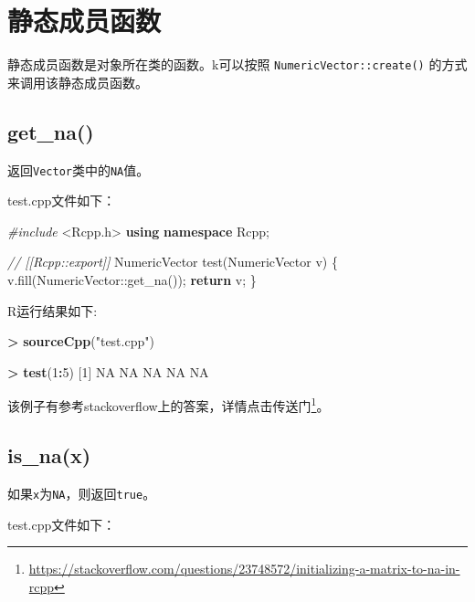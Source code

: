\documentclass[]{ctexbook}
\newenvironment{Shaded}{\begin{snugshade}}{\end{snugshade}}
\newcommand{\KeywordTok}[1]{\textcolor[rgb]{0.13,0.29,0.53}{\textbf{#1}}}
\newcommand{\DecValTok}[1]{\textcolor[rgb]{0.00,0.00,0.81}{#1}}
\newcommand{\StringTok}[1]{\textcolor[rgb]{0.31,0.60,0.02}{#1}}
\newcommand{\ImportTok}[1]{#1}
\newcommand{\CommentTok}[1]{\textcolor[rgb]{0.56,0.35,0.01}{\textit{#1}}}
\newcommand{\OtherTok}[1]{\textcolor[rgb]{0.56,0.35,0.01}{#1}}
\newcommand{\ControlFlowTok}[1]{\textcolor[rgb]{0.13,0.29,0.53}{\textbf{#1}}}
\newcommand{\OperatorTok}[1]{\textcolor[rgb]{0.81,0.36,0.00}{\textbf{#1}}}
\newcommand{\PreprocessorTok}[1]{\textcolor[rgb]{0.56,0.35,0.01}{\textit{#1}}}
\newcommand{\NormalTok}[1]{#1}
\renewcommand{\href}[2]{#2\footnote{\url{#1}}}
\begin{document}
\section{静态成员函数}\label{Static-member-functions}

静态成员函数是对象所在类的函数。k可以按照
\texttt{NumericVector::create()} 的方式来调用该静态成员函数。

\subsection{get\_na()}\label{get_na}

返回\texttt{Vector}类中的\texttt{NA}值。

test.cpp文件如下：

\begin{Shaded}
\begin{Highlighting}[]
\PreprocessorTok{#include }\ImportTok{<Rcpp.h>}
\KeywordTok{using} \KeywordTok{namespace}\NormalTok{ Rcpp;}

\CommentTok{// [[Rcpp::export]]}
\NormalTok{NumericVector test(NumericVector v) \{}
\NormalTok{  v.fill(NumericVector::get_na());}
  \ControlFlowTok{return}\NormalTok{ v;}
\NormalTok{\}}
\end{Highlighting}
\end{Shaded}

R运行结果如下:

\begin{Shaded}
\begin{Highlighting}[]
\OperatorTok{>}\StringTok{ }\KeywordTok{sourceCpp}\NormalTok{(}\StringTok{"test.cpp"}\NormalTok{)}

\OperatorTok{>}\StringTok{ }\KeywordTok{test}\NormalTok{(}\DecValTok{1}\OperatorTok{:}\DecValTok{5}\NormalTok{)}
\NormalTok{[}\DecValTok{1}\NormalTok{] }\OtherTok{NA} \OtherTok{NA} \OtherTok{NA} \OtherTok{NA} \OtherTok{NA}
\end{Highlighting}
\end{Shaded}

该例子有参考stackoverflow上的答案，详情点击\href{https://stackoverflow.com/questions/23748572/initializing-a-matrix-to-na-in-rcpp}{传送门}。

\subsection{is\_na(x)}\label{is_na}

如果\texttt{x}为\texttt{NA}，则返回\texttt{true}。

test.cpp文件如下：
\end{document}
